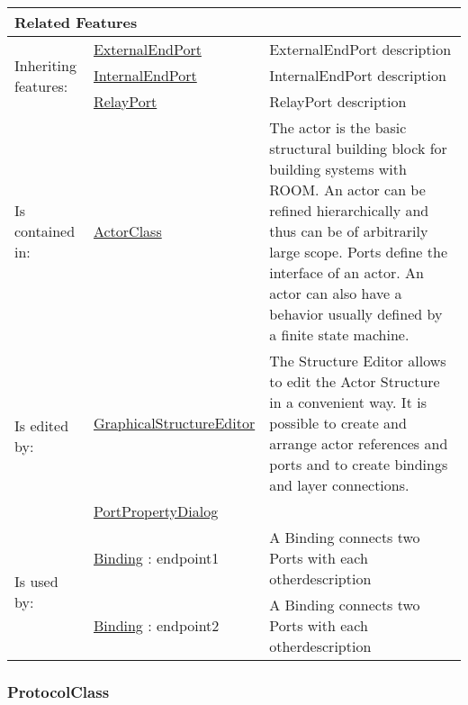 			\begingroup
			\renewcommand{\arraystretch}{1.8} %
			\begin{longtable}{p{2.5cm}|p{4cm} p{}}
				\multicolumn{2}{l}{\textbf{\large Related Features}} & \\
				\hline
			\multirow{3}{*}{Inheriting features:} & \tabitem \hyperlink{ref:ExternalEndPort}{ExternalEndPort}  & ExternalEndPort description\\
			& \tabitem \hyperlink{ref:InternalEndPort}{InternalEndPort}  & InternalEndPort description \\
			& \tabitem \hyperlink{ref:RelayPort}{RelayPort}  & RelayPort description \\
			\hline
			Is contained in: & \tabitem \hyperlink{ref:ActorClass}{ActorClass}  & The actor is the basic structural building block for building systems with ROOM. An actor can be refined hierarchically and thus can be of arbitrarily large scope. Ports define the interface of an actor. An actor can also have a behavior usually defined by a finite state machine. \\
			\hline
			\multirow{2}{*}{Is edited by:} & \tabitem \hyperlink{ref:GraphicalStructureEditor}{GraphicalStructureEditor}  & The Structure Editor allows to edit the Actor Structure in a convenient way. It is possible to create and arrange actor references and ports and to create bindings and layer connections.\\
			& \tabitem \hyperlink{ref:PortPropertyDialog}{PortPropertyDialog}  &  \\
			\hline
			\multirow{2}{*}{Is used by:} & \tabitem \hyperlink{ref:Binding}{Binding} : endpoint1 & A Binding connects two Ports with each otherdescription\\
			& \tabitem \hyperlink{ref:Binding}{Binding} : endpoint2 & A Binding connects two Ports with each otherdescription \\
			\hline
			\end{longtable}
			\endgroup
			
			
			
		\vspace{\baselineskip}
		\vspace{\baselineskip}
		\vspace{\baselineskip}
		
		\subsubsection{\huge ProtocolClass}
			\hypertarget{ref:ProtocolClass}{}
			
